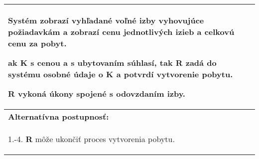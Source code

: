 \begin{center}
\begin{tabularx}{\textwidth}{| X |}
\begin{compactenum}
\begin{compactenum}
      \end{compactenum}
    \item Systém zobrazí vyhľadané voľné izby vyhovujúce požiadavkám a zobrazí cenu jednotlivých izieb a celkovú cenu za pobyt.
    \item ak \textbf{K} s cenou a s ubytovaním súhlasí, tak \textbf{R} zadá do systému osobné údaje o \textbf{K} a potvrdí vytvorenie pobytu.
    \item \textbf{R} vykoná úkony spojené s odovzdaním izby.
  \end{compactenum}\\
  \hline
  \textbf{Alternatívna postupnosť:} \\
  \begin{compactenum}
    \item[1.-4.] \textbf{R} môže ukončiť proces vytvorenia pobytu.
  \end{compactenum}\\
  \hline

\end{tabularx}
\end{center}
